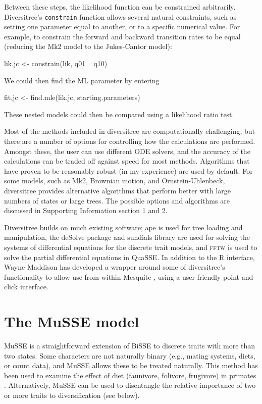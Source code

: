 \documentclass[12pt]{article}
\newcommand\code\texttt
\begin{document}
Between these steps, the likelihood function can be constrained
arbitrarily.  Diversitree's \code{constrain} function allows several
natural constraints, such as setting one parameter equal to another,
or to a specific numerical value.  For example, to constrain the
forward and backward transition rates to be equal (reducing the Mk2
model to the Jukes-Cantor model):
\begin{Sinput}
lik.jc <- constrain(lik, q01 ~ q10)
\end{Sinput}
We could then find the ML parameter by entering
\begin{Sinput}
fit.jc <- find.mle(lik.jc, starting.parameters)
\end{Sinput}
These nested models could then be compared using a likelihood ratio
test.

Most of the methods included in diversitree are computationally
challenging, but there are a number of options for controlling how the
calculations are performed.  Amongst these, the user can use different
ODE solvers, and the accuracy of the calculations can be traded off
against speed for most methods.
%
Algorithms that have proven to be reasonably robust (in my experience)
are used by default.
%
For some models, such as Mk2, Brownian motion, and Ornstein-Uhlenbeck,
diversitree provides alternative algorithms that perform better with
large numbers of states or large trees.  The possible options and
algorithms are discussed in Supporting Information section 1 and 2.

Diversitree builds on much existing software; ape \citep{ape} is used
for tree loading and manipulation, the deSolve package \citep{deSolve}
and sundials library \citep{sundials} are used for solving the systems
of differential equations for the discrete trait models, and
\textsc{fftw} \citep{fftw} is used to solve the partial differential
equations in QuaSSE.
%
In addition to the R interface, Wayne Maddison has developed a wrapper
around some of diversitree's functionality to allow use from within
Mesquite \citep{Mesquite}, using a user-friendly point-and-click
interface.

\section{The MuSSE model}
MuSSE is a straightforward extension of BiSSE to discrete traits with
more than two states.
%
Some characters are not naturally binary (e.g., mating systems, diets,
or count data), and MuSSE allows these to be treated naturally.  This
method has been used to examine the effect of diet (faunivore,
folivore, frugivore) in primates \citep{Gomez-2012}.
%
Alternatively, MuSSE can be used to disentangle the relative
importance of two or more traits to diversification (see below).
\end{document}
